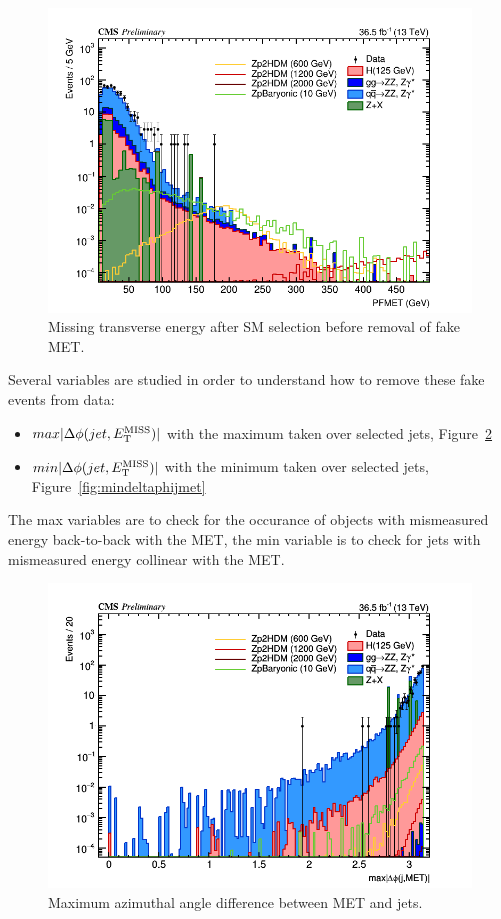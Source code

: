 \begin{figure}[tbh]
\centering
\includegraphics[width=5in]{figures/hist_hPFMET_8.png}
\caption{Missing transverse energy after SM selection before removal of fake MET.}
\label{fig:pfmet_m4lblinded}
\end{figure}

Several variables are studied in order to understand how to remove these fake events from data:

\begin{itemize}
  \item $max|\Delta\phi(jet, E_{\rm{T}}^{\rm{MISS}})|$ with the maximum taken over selected jets, Figure~\ref{fig:maxdeltaphijmet}
  \item $min|\Delta\phi(jet, E_{\rm{T}}^{\rm{MISS}})|$ with the minimum taken over selected jets, Figure~\ref{fig:mindeltaphijmet}
\end{itemize}

The max variables are to check for the occurance of objects with mismeasured energy back-to-back with the MET, the min variable is to check for jets with mismeasured energy collinear with the MET.

\begin{figure}[tbh]
\centering
\includegraphics[width=5in]{figures/hist_hDPHI_MAX_JET_MET_8.png}
\caption{Maximum azimuthal angle difference between MET and jets.}
\label{fig:maxdeltaphijmet}
\end{figure}

